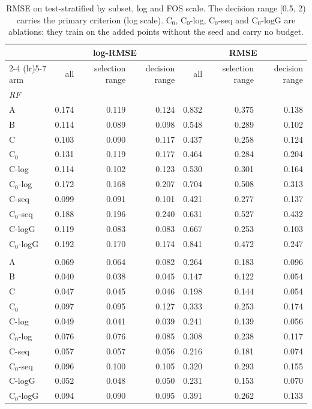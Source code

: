 \begin{table}[htbp]
\centering
\caption{RMSE on test-stratified by subset, log and FOS scale. The decision range [0.5, 2) carries the primary criterion (log scale). C$_0$, C$_0$-log, C$_0$-seq and C$_0$-logG are ablations: they train on the added points without the seed and carry no budget.}
\label{tab:test-stratified__log-rmse:subsets}
\begin{tabular}{lrrrrrr}
\toprule
 & \multicolumn{3}{c}{log-RMSE} & \multicolumn{3}{c}{RMSE} \\
\cmidrule(lr){2-4} \cmidrule(lr){5-7}
arm & all & selection range & decision range & all & selection range & decision range \\
\midrule
\multicolumn{7}{l}{\textit{RF}} \\
A & 0.174 & 0.119 & 0.124 & 0.832 & 0.375 & 0.138 \\
B & 0.114 & 0.089 & 0.098 & 0.548 & 0.289 & 0.102 \\
C & 0.103 & 0.090 & 0.117 & 0.437 & 0.258 & 0.124 \\
C$_0$ & 0.131 & 0.119 & 0.177 & 0.464 & 0.284 & 0.204 \\
C-log & 0.114 & 0.102 & 0.123 & 0.530 & 0.301 & 0.164 \\
C$_0$-log & 0.172 & 0.168 & 0.207 & 0.704 & 0.508 & 0.313 \\
C-seq & 0.099 & 0.091 & 0.101 & 0.421 & 0.277 & 0.137 \\
C$_0$-seq & 0.188 & 0.196 & 0.240 & 0.631 & 0.527 & 0.432 \\
C-logG & 0.119 & 0.083 & 0.083 & 0.667 & 0.253 & 0.103 \\
C$_0$-logG & 0.192 & 0.170 & 0.174 & 0.841 & 0.472 & 0.247 \\
\addlinespace
\multicolumn{7}{l}{\textit{GBM}} \\
A & 0.069 & 0.064 & 0.082 & 0.264 & 0.183 & 0.096 \\
B & 0.040 & 0.038 & 0.045 & 0.147 & 0.122 & 0.054 \\
C & 0.047 & 0.045 & 0.046 & 0.198 & 0.144 & 0.054 \\
C$_0$ & 0.097 & 0.095 & 0.127 & 0.333 & 0.253 & 0.174 \\
C-log & 0.049 & 0.041 & 0.039 & 0.241 & 0.139 & 0.056 \\
C$_0$-log & 0.076 & 0.076 & 0.085 & 0.308 & 0.238 & 0.117 \\
C-seq & 0.057 & 0.057 & 0.056 & 0.216 & 0.181 & 0.074 \\
C$_0$-seq & 0.096 & 0.100 & 0.105 & 0.320 & 0.293 & 0.155 \\
C-logG & 0.052 & 0.048 & 0.050 & 0.231 & 0.153 & 0.070 \\
C$_0$-logG & 0.094 & 0.090 & 0.095 & 0.391 & 0.262 & 0.133 \\
\bottomrule
\end{tabular}
\end{table}

